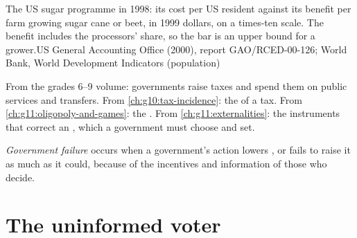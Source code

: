 \begin{openingchart}{The US sugar programme in 1998: its cost per US resident against its benefit per farm growing sugar cane or beet, in 1999 dollars, on a times-ten
scale. The benefit includes the processors' share, so the bar is an upper bound for a grower.}{US General Accounting Office (2000), report GAO/RCED-00-126; World Bank,
World Development Indicators (population)}
\end{openingchart}

\begin{recall}
From the grades 6--9 volume: governments raise taxes and spend them on public services and transfers. From \cref{ch:g10:tax-incidence}: the
 of a tax. From \cref{ch:g11:oligopoly-and-games}: the . From \cref{ch:g11:externalities}: the instruments that
correct an , which a government must choose and set.
\end{recall}

\begin{definition}\label{def:g11:public-choice-first-look:government-failure}
\emph{Government failure} occurs when a government's action lowers , or fails to raise it as much as it could, because of the
incentives and information of those who decide.
\end{definition}

\section{The uninformed voter}\label{sec:g11:public-choice-first-look:voter}

